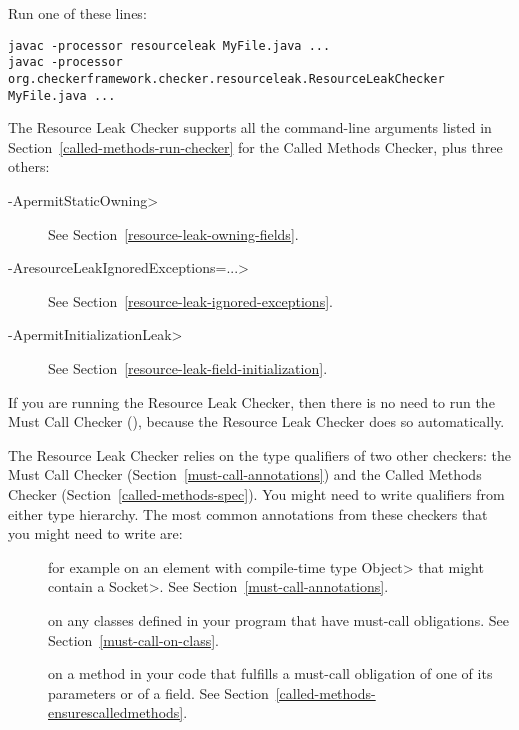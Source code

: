 
Run one of these lines:

\begin{Verbatim}
javac -processor resourceleak MyFile.java ...
javac -processor org.checkerframework.checker.resourceleak.ResourceLeakChecker MyFile.java ...
\end{Verbatim}

The Resource Leak Checker supports all the command-line arguments
listed in Section~\ref{called-methods-run-checker} for
the Called Methods Checker, plus three others:

\begin{description}
\item[\<-ApermitStaticOwning>]
  See Section~\ref{resource-leak-owning-fields}.
\item[\<-AresourceLeakIgnoredExceptions=...>]
  See Section~\ref{resource-leak-ignored-exceptions}.
\item[\<-ApermitInitializationLeak>]
  See Section~\ref{resource-leak-field-initialization}.
\end{description}

If you are running the Resource Leak Checker, then there is no need to run
the Must Call Checker (), because the
Resource Leak Checker does so automatically.



The Resource Leak Checker relies on the type qualifiers of two other checkers:
the Must Call Checker (Section~\ref{must-call-annotations}) and
the Called Methods Checker (Section~\ref{called-methods-spec}). You might need
to write qualifiers from either type hierarchy. The most common annotations from
these checkers that you might need to write are:

\begin{description}

\item[]
for example on an element with compile-time type \<Object> that might contain a \<Socket>.
See Section~\ref{must-call-annotations}.

\item[]
on any classes defined in your program that have must-call obligations. See Section~\ref{must-call-on-class}.

\item[] on a method in
your code that fulfills a must-call obligation of one of its parameters or of a field.
See Section~\ref{called-methods-ensurescalledmethods}.

\end{description}

